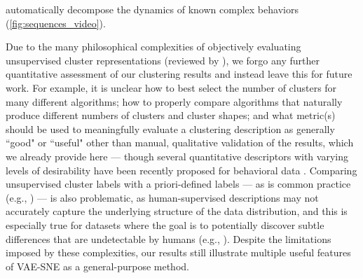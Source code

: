 automatically decompose the dynamics of known complex behaviors (\ref{fig:sequences_video}).

Due to the many philosophical complexities of objectively evaluating unsupervised cluster representations (reviewed by \citealt{jain1999data, kleinberg2003impossibility, todd2017systematic}), we forgo any further quantitative assessment of our clustering results and instead leave this for future work. For example, it is unclear how to best select the number of clusters for many different algorithms; how to properly compare algorithms that naturally produce different numbers of clusters and cluster shapes; and what metric(s) should be used to meaningfully evaluate a clustering description as generally ``good" or ``useful" other than manual, qualitative validation of the results, which we already provide here --- though several quantitative descriptors with varying levels of desirability have been recently proposed for behavioral data \citep{todd2017systematic}. Comparing unsupervised cluster labels with a priori-defined labels --- as is common practice (e.g., \citealt{jiang2016variational, xie2016unsupervised, guo2017improved, yang2019deep, luxem2020identifying}) --- is also problematic, as human-supervised descriptions may not accurately capture the underlying structure of the data distribution, and this is especially true for datasets where the goal is to potentially discover subtle differences that are undetectable by humans (e.g., \citealt{wiltschko2015mapping}). Despite the limitations imposed by these complexities, our results still illustrate multiple useful features of VAE-SNE as a general-purpose method.

